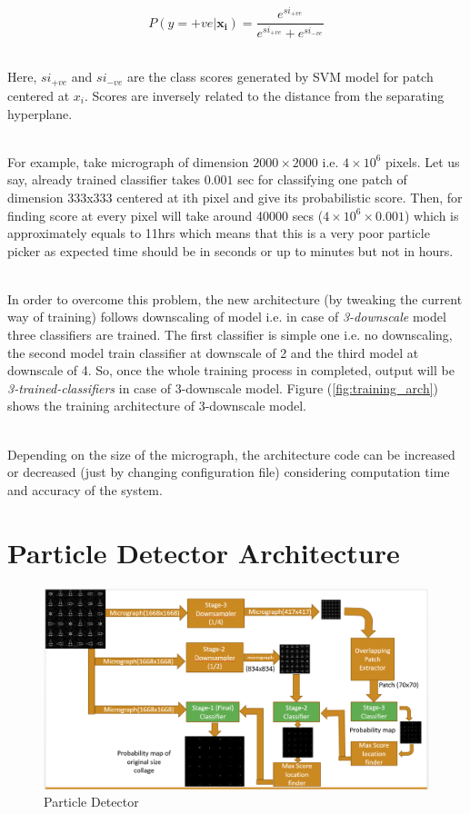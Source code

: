 \documentclass[twoside]{iitbreport}
\begin{document}
\begin{equation}\label{eq:softmax}
    P(y=+ve | \boldsymbol{x_i}) = \frac{e^{si_{+ve}}}{e^{si_{+ve}}+e^{si_{-ve}}}
\end{equation}

\noindent\\
Here, $si_{+ve}$ and $si_{-ve}$ are the class scores generated by SVM model for patch centered at $x_i$. Scores are inversely related to the distance from  the separating hyperplane. 

\noindent\\
For example, take micrograph of dimension $2000\times2000$ i.e. $4\times10^6$ pixels. Let us say, already trained classifier takes $0.001$ sec for classifying one patch of dimension 333x333 centered at ith pixel and give its probabilistic score. Then, for finding score at every pixel will take around 40000 secs ($4\times10^6\times0.001$) which is approximately equals to 11hrs which means that this is a very poor particle picker as expected time should be in seconds or up to minutes but not in hours.


\noindent\\
In order to overcome this problem, the new architecture (by tweaking the current way of training) follows downscaling of model i.e. in case of \textit{3-downscale} model three classifiers are trained.  The first classifier is simple one i.e. no downscaling, the second model train classifier at downscale of 2 and the third model at downscale of 4. So, once the whole training process in completed, output will be \textit{3-trained-classifiers} in case of 3-downscale model. Figure (\ref{fig:training_arch}) shows the training architecture of 3-downscale model.

\noindent\\
Depending on the size of the micrograph, the architecture code can be increased or decreased (just by changing configuration file) considering computation time and accuracy of the system. 

\section{Particle Detector Architecture}\label{sec:detector_ach}

\begin{figure}[H]
\includegraphics[width=1\textwidth]{test_arch_1}
\centering
\captionsetup{justification=centering}
\caption{Particle Detector}
\label{fig:test_arch}
\end{figure}
\end{document}
